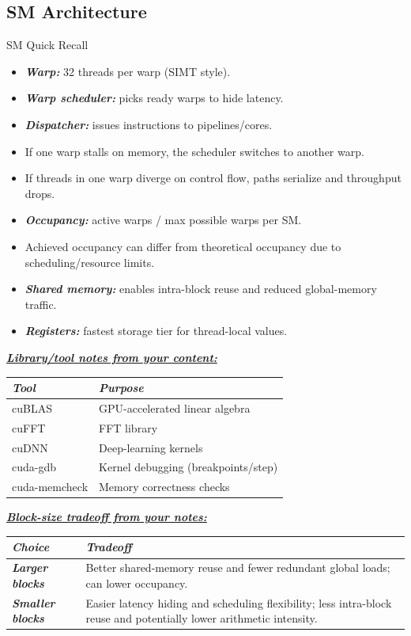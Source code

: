 \documentclass[12pt]{article}
\newcommand{\keysent}[1]{\textbf{\textit{\uline{#1}}}}
\let\origtextbf\textbf
\renewcommand{\textbf}[1]{\origtextbf{\textit{#1}}}
\begin{document}
\subsection{SM Architecture}
\begin{greenbox}{SM Quick Recall}
\begin{itemize}
\item \textbf{Warp:} 32 threads per warp (SIMT style).
\item \textbf{Warp scheduler:} picks ready warps to hide latency.
\item \textbf{Dispatcher:} issues instructions to pipelines/cores.
\item If one warp stalls on memory, the scheduler switches to another warp.
\item If threads in one warp diverge on control flow, paths serialize and throughput drops.
\item \textbf{Occupancy:} active warps / max possible warps per SM.
\item Achieved occupancy can differ from theoretical occupancy due to scheduling/resource limits.
\item \textbf{Shared memory:} enables intra-block reuse and reduced global-memory traffic.
\item \textbf{Registers:} fastest storage tier for thread-local values.
\end{itemize}
\end{greenbox}

\keysent{Library/tool notes from your content:}\par
{\footnotesize
\begin{tabularx}{\textwidth}{|>{\raggedright\arraybackslash}p{2.3cm}|X|}
\hline
\textbf{Tool} & \textbf{Purpose} \\
\hline
cuBLAS & GPU-accelerated linear algebra \\
\hline
cuFFT & FFT library \\
\hline
cuDNN & Deep-learning kernels \\
\hline
cuda-gdb & Kernel debugging (breakpoints/step) \\
\hline
cuda-memcheck & Memory correctness checks \\
\hline
\end{tabularx}
}

\keysent{Block-size tradeoff from your notes:}\par
{\footnotesize
\begin{tabularx}{\textwidth}{|>{\raggedright\arraybackslash}p{2.9cm}|X|}
\hline
\textbf{Choice} & \textbf{Tradeoff} \\
\hline
\textbf{Larger blocks} & Better shared-memory reuse and fewer redundant global loads; can lower occupancy. \\
\hline
\textbf{Smaller blocks} & Easier latency hiding and scheduling flexibility; less intra-block reuse and potentially lower arithmetic intensity. \\
\hline
\end{tabularx}
}
\end{document}
